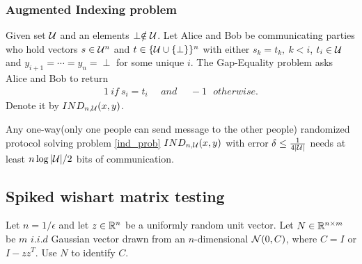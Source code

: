 \subsubsection{Augmented Indexing problem}
\begin{prob}
\label{ind_prob}
Given set $\mathcal{U}$ and an elements $\perp\notin\mathcal{U}$.
Let Alice and Bob be communicating parties who hold vectors $s\in\mathcal{U}^n$ and $t\in\{\mathcal{U}\cup\{\perp\}\}^n$
with either $s_k=t_k,~k<i$, $t_i\in\mathcal{U}$ and $y_{i+1}=\cdots=y_n=\perp$ for some unique $i$.
The Gap-Equality problem asks Alice and Bob to return
\begin{align*}
    1~if~s_i=t_i~~~~~~and~~~~~~-1~~~otherwise.
\end{align*}
Denote it by $IND_{n,\mathcal{U}}(x,y)$.
\end{prob}
\begin{thm}
\label{ind_complexity}
Any one-way(only one people can send message to the other people) randomized protocol solving problem \ref{ind_prob} $IND_{n,\mathcal{U}}(x,y)$ with error $\delta\le\frac{1}{4|\mathcal{U}|}$ needs at least $n\log|\mathcal{U}|/2$ bits of communication.
\end{thm}

\subsection{Spiked wishart matrix testing}
\begin{prob}
\label{spiked_wishart}
Let $n=1/\epsilon$ and let $z\in\mathbb{R}^n$ be a uniformly random unit vector. Let $N\in\mathbb{R}^{n\times m}$ be $m$ $i.i.d$ Gaussian vector drawn from an $n$-dimensional $\mathcal{N}(0,C)$, where $C=I$ or $I-zz^T$. Use $N$ to identify $C$.
\end{prob}

